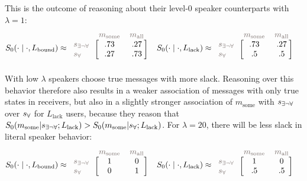 \documentclass[a4paper, 11pt]{article}
\theoremstyle{Satz}
\newcommand{\state}{\ensuremath{s}\xspace}		%
\newcommand{\mystate}[1]{\ensuremath{\state_{\text{#1}}}\xspace} %
\newcommand{\mylang}[1]{\ensuremath{L_{\text{#1}}}\xspace} %
\newcommand{\messg}{\ensuremath{m}\xspace}		%
\newcommand{\mymessg}[1]{\ensuremath{\messg_{\text{#1}}}\xspace} %
\newcommand{\ssome}{\mystate{\ensuremath{\exists\neg\forall}}}
\newcommand{\sall}{\mystate{\ensuremath{\forall}}}
\newcommand{\msome}{\mymessg{some}}
\newcommand{\mall}{\mymessg{all}}
\newcommand{\Lbound}{\mylang{bound}}
\newcommand{\Llack}{\mylang{lack}}
\newcommand{\mygray}[1]{{\textcolor{mygray}{#1}}}
\begin{document}
This is the outcome of reasoning about their level-$0$ speaker counterparts with $\lambda = 1$:
\begin{align*}
  S_0(\cdot \mid \cdot, \Lbound) & \approx \begin{blockarray}{lcc}
    & \mygray{\msome} & \mygray{\mall} \\
    \begin{block}{l[cc]}
      \mygray{\ssome} & .73 & .27 \\
      \mygray{\sall}  & .27 & .73 \\
    \end{block}
  \end{blockarray} &
  S_0(\cdot \mid \cdot, \Llack) & \approx \begin{blockarray}{lcc}
    & \mygray{\msome} & \mygray{\mall} \\
    \begin{block}{l[cc]}
      \mygray{\ssome} & .73 & .27 \\
      \mygray{\sall}  & .5 & .5 \\
    \end{block}
  \end{blockarray} 
\end{align*}
With low $\lambda$ speakers choose true messages with more slack. Reasoning over this behavior therefore also results in a weaker association of messages with only true states in receivers, but also in a slightly stronger association of $\msome$ with $\ssome$ over $\sall$ for $\Llack$ users, because they reason that $S_0(\msome | \ssome;\Llack) > S_0(\msome | \sall;\Llack)$. For $\lambda = 20$, there will be less slack in literal speaker behavior:
\begin{align*}
  S_0(\cdot \mid \cdot, \Lbound) & \approx \begin{blockarray}{lcc}
    & \mygray{\msome} & \mygray{\mall} \\
    \begin{block}{l[cc]}
      \mygray{\ssome} & 1 & 0 \\
      \mygray{\sall}  & 0 & 1 \\
    \end{block}
  \end{blockarray} &
  S_0(\cdot \mid \cdot, \Llack) & \approx \begin{blockarray}{lcc}
    & \mygray{\msome} & \mygray{\mall} \\
    \begin{block}{l[cc]}
      \mygray{\ssome} &  1 & 0 \\
      \mygray{\sall}  & .5 & .5 \\
    \end{block}
  \end{blockarray} 
\end{align*}
\end{document}
